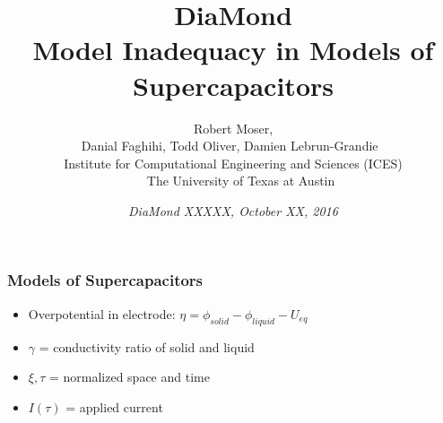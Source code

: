 \documentclass[8pt]{beamer}
\title[Model Inadequacy in Supercapacitors]{
DiaMond\\
{\small Model Inadequacy in Models of Supercapacitors}
}
\author[Moser et al]{
Robert Moser,\\ 
Danial Faghihi,
Todd Oliver,
Damien Lebrun-Grandie
$~$\\
{\small
Institute for Computational Engineering and Sciences (ICES)\\
$\quad~$The University of Texas at Austin
}
}
\date[DiaMond October 2016]{
{\it DiaMond XXXXX,
October XX, 2016
}
}
\begin{document}
\begin{frame}
\frametitle{Models of Supercapacitors}
\vfill

\begin{itemize}

\item Overpotential in electrode: $\eta = \phi_{solid}-\phi_{liquid}-U_{eq}$\\
\item $\gamma$ = conductivity ratio of solid and liquid \\
\item $\xi, \tau$ = normalized space and time \\
\item $I(\tau)$ = applied current


\end{itemize}
\end{frame}
\end{document}
